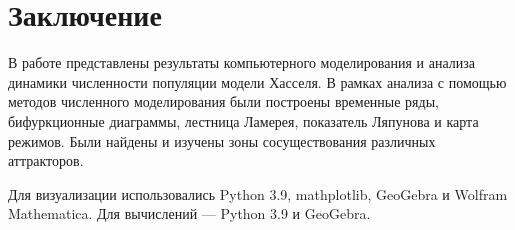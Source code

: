 \section{Заключение}

    В работе представлены результаты компьютерного моделирования и анализа динамики численности популяции модели Хасселя. В рамках анализа с помощью методов численного моделирования были построены временные ряды, бифуркционные диаграммы, лестница Ламерея, показатель Ляпунова и карта режимов. Были найдены и изучены зоны сосуществования различных аттракторов.

    Для визуализации использовались Python 3.9, mathplotlib, GeoGebra и Wolfram Mathematica. Для вычислений --- Python 3.9 и GeoGebra.